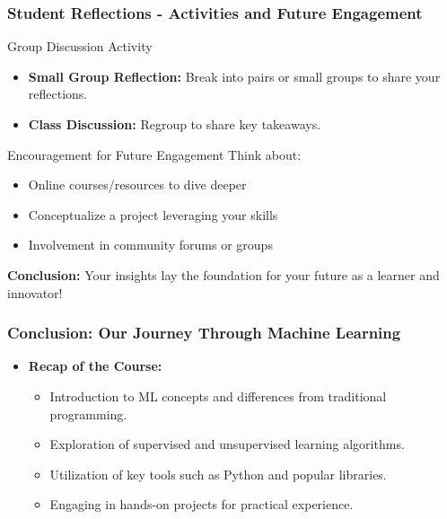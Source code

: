 \documentclass[aspectratio=169]{beamer}
\begin{document}
\begin{frame}[fragile]
    \frametitle{Student Reflections - Activities and Future Engagement}
    \begin{block}{Group Discussion Activity}
        \begin{itemize}
            \item \textbf{Small Group Reflection:} Break into pairs or small groups to share your reflections. 
            \item \textbf{Class Discussion:} Regroup to share key takeaways.
        \end{itemize}
    \end{block}

    \begin{block}{Encouragement for Future Engagement}
        Think about:
        \begin{itemize}
            \item Online courses/resources to dive deeper 
            \item Conceptualize a project leveraging your skills 
            \item Involvement in community forums or groups
        \end{itemize}
    \end{block}

    \textbf{Conclusion:} Your insights lay the foundation for your future as a learner and innovator!
\end{frame}

\begin{frame}[fragile]
    \frametitle{Conclusion: Our Journey Through Machine Learning}
    
    \begin{itemize}
        \item \textbf{Recap of the Course:}
        \begin{itemize}
            \item Introduction to ML concepts and differences from traditional programming.
            \item Exploration of supervised and unsupervised learning algorithms.
            \item Utilization of key tools such as Python and popular libraries.
            \item Engaging in hands-on projects for practical experience.
        \end{itemize}
    \end{itemize}
\end{frame}
\end{document}
